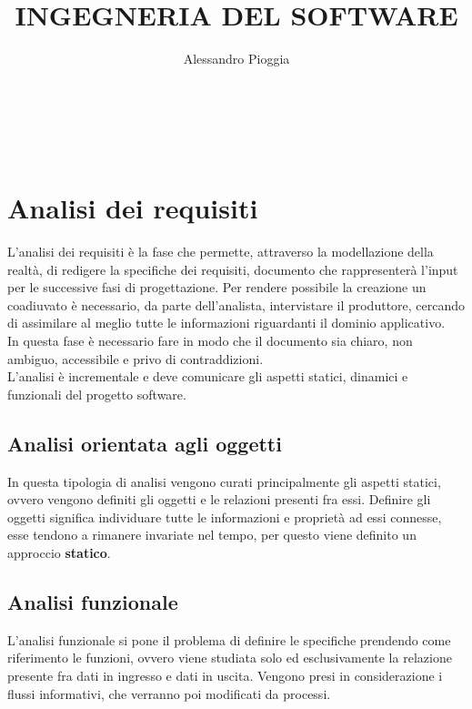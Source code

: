\documentclass[a4paper,12pt]{report}
\title{\textbf{INGEGNERIA DEL SOFTWARE}}
\author{Alessandro Pioggia}
\begin{document}
	\makeatletter
	\begin{titlepage}
		\begin{center}
			{\Huge  \@title }\\[3ex] 
			{\large  \@author}\\[3ex] 
			{\large \@date}
		\end{center}
	\end{titlepage}
	\makeatother
	\thispagestyle{empty}
	\newpage
	
	
	\tableofcontents
	
	
	
	\newpage
	
	\chapter{Analisi dei requisiti}
	L'analisi dei requisiti è la fase che permette, attraverso la modellazione della realtà, di redigere la specifiche dei requisiti, documento che rappresenterà l'input per le successive fasi di progettazione. Per rendere possibile la creazione un coadiuvato è necessario, da parte dell'analista, intervistare il produttore, cercando di assimilare al meglio tutte le informazioni riguardanti il dominio applicativo. \\
	In questa fase è necessario fare in modo che il documento sia chiaro, non ambiguo, accessibile e privo di contraddizioni.\\
	L'analisi è incrementale e deve comunicare gli aspetti statici, dinamici e funzionali del progetto software.
	\section{Analisi orientata agli oggetti}
	In questa tipologia di analisi vengono curati principalmente gli aspetti statici, ovvero vengono definiti gli oggetti e le relazioni presenti fra essi. Definire gli oggetti significa individuare tutte le informazioni e proprietà ad essi connesse, esse tendono a rimanere invariate nel tempo, per questo viene definito un approccio \textbf{statico}.
	\section{Analisi funzionale}
	L'analisi funzionale si pone il problema di definire le specifiche prendendo come riferimento le funzioni, ovvero viene studiata solo ed esclusivamente la relazione presente fra dati in ingresso e dati in uscita. Vengono presi in considerazione i flussi informativi, che verranno poi modificati da processi.
\end{document}
